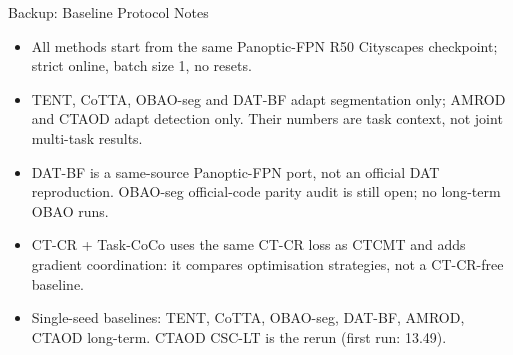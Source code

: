 \begin{frame}{Backup: Baseline Protocol Notes}
\small
\begin{itemize}
  \setlength{\itemsep}{3pt}
  \item All methods start from the same Panoptic-FPN R50 Cityscapes checkpoint;
        strict online, batch size 1, no resets.
  \item TENT, CoTTA, OBAO-seg and DAT-BF adapt segmentation only;
        AMROD and CTAOD adapt detection only.
        Their numbers are task context, not joint multi-task results.
  \item DAT-BF is a same-source Panoptic-FPN port, not an official DAT reproduction.
        OBAO-seg official-code parity audit is still open; no long-term OBAO runs.
  \item CT-CR + Task-CoCo uses the same CT-CR loss as CTCMT and adds gradient
        coordination: it compares optimisation strategies, not a CT-CR-free baseline.
  \item Single-seed baselines: TENT, CoTTA, OBAO-seg, DAT-BF, AMROD, CTAOD long-term.
        CTAOD CSC-LT is the rerun (first run: 13.49).
\end{itemize}
\end{frame}
